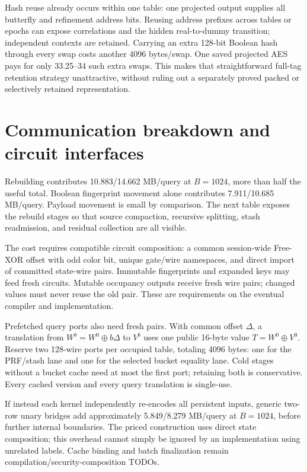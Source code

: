 \documentclass[11pt]{article}
\begin{document}
Hash reuse already occurs within one table: one projected output supplies
all butterfly and refinement address bits. Reusing address prefixes across
tables or epochs can expose correlations and the hidden real-to-dummy
transition; independent contexts are retained. Carrying an extra 128-bit
Boolean hash through every swap costs another 4096 bytes/swap. One saved
projected AES pays for only 33.25--34 such extra swaps. This makes that
straightforward full-tag retention strategy unattractive, without ruling
out a separately proved packed or selectively retained representation.

\section{Communication breakdown and circuit interfaces}

Rebuilding contributes 10.883/14.662 MB/query at $B=1024$, more than half
the useful total. Boolean fingerprint movement alone contributes
7.911/10.685 MB/query. Payload movement is small by comparison. The next
table exposes the rebuild stages so that source compaction, recursive
splitting, stash readmission, and residual collection are all visible.


The cost requires compatible circuit composition: a common session-wide
Free-XOR offset with odd color bit, unique gate/wire namespaces, and direct
import of committed state-wire pairs. Immutable fingerprints and expanded
keys may feed fresh circuits. Mutable occupancy outputs receive fresh
wire pairs; changed values must never reuse the old pair. These are
requirements on the eventual compiler and implementation.

Prefetched query ports also need fresh pairs. With common offset $\Delta$,
a translation from $W^b=W^0\oplus b\Delta$ to $V^b$ uses one public
16-byte value $T=W^0\oplus V^0$. Reserve two 128-wire ports per occupied
table, totaling 4096 bytes: one for the PRF/stash lane and one for the
selected bucket equality lane. Cold stages without a bucket cache need
at most the first port; retaining both is conservative. Every cached
version and every query translation is single-use.

If instead each kernel independently re-encodes all persistent inputs,
generic two-row unary bridges add approximately 5.849/8.279 MB/query at
$B=1024$, before further internal boundaries. The priced construction uses
direct state composition; this overhead cannot simply be ignored by an
implementation using unrelated labels. Cache binding and batch finalization
remain compilation/security-composition TODOs.
\end{document}
